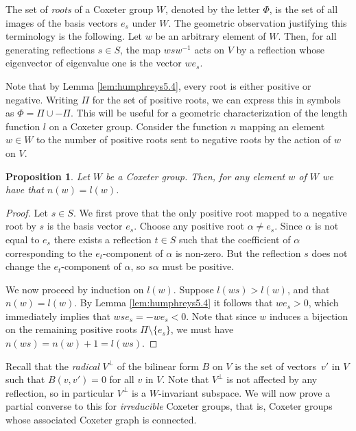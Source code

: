 \documentclass{article}
\newtheorem{proposition}[theorem]{Proposition}
\theoremstyle{definition}
\begin{document}
The set of \textit{roots} of a Coxeter group $W$, denoted by the letter $\Phi$, is the set of all images of the basis vectors $e_s$ under $W$. The geometric observation justifying this terminology is the following. Let $w$ be an arbitrary element of $W$. Then, for all generating reflections $s \in S$, the map $wsw^{-1}$ acts on $V$ by a reflection whose eigenvector of eigenvalue one is the vector $we_s$.

Note that by Lemma \ref{lem:humphreys5.4}, every root is either positive or negative. Writing $\Pi$ for the set of positive roots, we can express this in symbols as $\Phi = \Pi \cup -\Pi$. This will be useful for a geometric characterization of the length function $l$ on a Coxeter group. Consider the function $n$ mapping an element $w \in W$ to the number of positive roots sent to negative roots by the action of $w$ on $V$.

\begin{proposition}\label{prop:n=l}
Let $W$ be a Coxeter group. Then, for any element $w$ of $W$ we have that $n(w) = l(w)$.
\end{proposition}

\begin{proof}
Let $s \in S$. We first prove that the only positive root mapped to a negative root by $s$ is the basis vector $e_s$. Choose any positive root $\alpha \neq e_s$. Since $\alpha$ is not equal to $e_s$ there exists a reflection $t \in S$ such that the coefficient of $\alpha$ corresponding to the $e_t$-component of $\alpha$ is non-zero. But the reflection $s$ does not change the $e_t$-component of $\alpha$, so $s\alpha$ must be positive.

We now proceed by induction on $l(w)$. Suppose $l(ws) > l(w)$, and that $n(w) = l(w)$. By Lemma \ref{lem:humphreys5.4} it follows that $we_s > 0$, which immediately implies that $wse_s = -we_s < 0$. Note that since $w$ induces a bijection on the remaining positive roots $\Pi \setminus \{e_s\}$, we must have $n(ws) = n(w) + 1 = l(ws)$.
\end{proof}

Recall that the \textit{radical} $V^\perp$ of the bilinear form $B$ on $V$ is the set of vectors~$v'$ in $V$ such that $B(v, v') = 0$ for all $v$ in $V$. Note that $V^\perp$ is not affected by any reflection, so in particular $V^\perp$ is a $W$-invariant subspace. We will now prove a partial converse to this for \textit{irreducible} Coxeter groups, that is, Coxeter groups whose associated Coxeter graph is connected.
\end{document}
